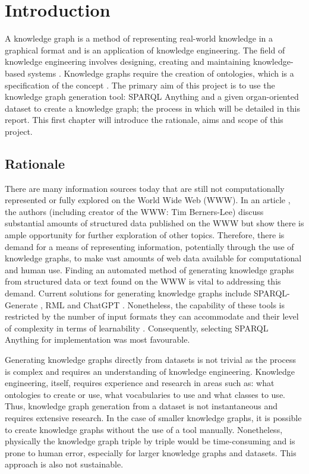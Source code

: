 \chapter{Introduction}
A knowledge graph is a method of representing real-world knowledge in a graphical format and is an application of knowledge engineering. The field of knowledge engineering involves designing, creating and maintaining knowledge-based systems \cite{studer_benjamins_fensel_1998}. Knowledge graphs require the creation of ontologies, which is a specification of the concept \cite{Breitman2007}. The primary aim of this project is to use the knowledge graph generation tool: SPARQL Anything and a given organ-oriented dataset to create a knowledge graph; the process in which will be detailed in this report. This first chapter will introduce the rationale, aims and scope of this project. 

\section{Rationale}
\hspace{0.5cm} There are many information sources today that are still not computationally represented or fully explored on the World Wide Web (WWW). In an article \cite{bizer2011linked}, the authors (including creator of the WWW: Tim Berners-Lee) discuss substantial amounts of structured data published on the WWW but show there is ample opportunity for further exploration of other topics. Therefore, there is demand for a means of representing information, potentially through the use of knowledge graphs, to make vast amounts of web data available for computational and human use. Finding an automated method of generating knowledge graphs from structured data or text found on the WWW is vital to addressing this demand. Current solutions for generating knowledge graphs include SPARQL-Generate \cite{sparqlgenerate}, RML \cite{rml} and ChatGPT \cite{chatgptwebsite}. Nonetheless, the capability of these tools is restricted by the number of input formats they can accommodate and their level of complexity in terms of learnability \cite{sparqlanything}. Consequently, selecting SPARQL Anything \cite{sparqlanythinggithub} for implementation was most favourable. 

Generating knowledge graphs directly from datasets is not trivial as the process is complex and requires an understanding of knowledge engineering. Knowledge engineering, itself, requires experience and research in areas such as: what ontologies to create or use, what vocabularies to use and what classes to use. Thus, knowledge graph generation from a dataset is not instantaneous and requires extensive research. In the case of smaller knowledge graphs, it is possible to create knowledge graphs without the use of a tool manually. Nonetheless, physically the knowledge graph triple by triple would be time-consuming and is prone to human error, especially for larger knowledge graphs and datasets. This approach is also not sustainable. 

